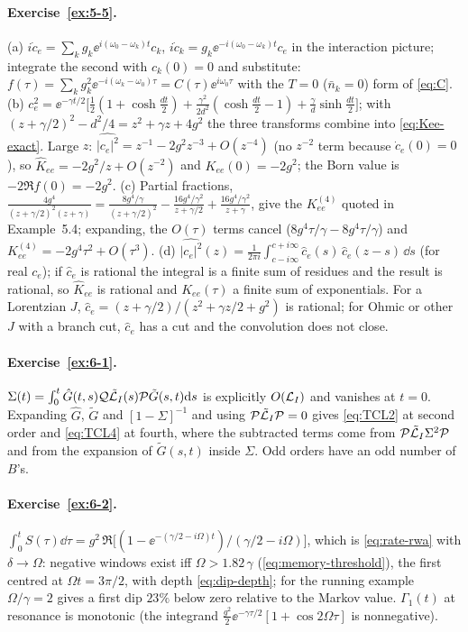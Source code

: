 \paragraph{Exercise~\ref{ex:5-5}.}
(a) $i\dot c_e=\sum_kg_k\ee^{i(\omega_0-\omega_k)t}c_k$, $i\dot c_k=g_k\ee^{-i(\omega_0-\omega_k)t}c_e$ in the interaction picture; integrate the second with $c_k(0)=0$ and substitute: $f(\tau)=\sum_kg_k^2\ee^{-i(\omega_k-\omega_0)\tau}=C(\tau)\ee^{i\omega_0\tau}$ with the $T=0$ ($\bar n_k=0$) form of \cref{eq:C}.
(b) $c_e^2=\ee^{-\gamma t/2}\big[\tfrac12(1+\cosh\tfrac{dt}2)+\tfrac{\gamma^2}{2d^2}(\cosh\tfrac{dt}2-1)+\tfrac\gamma d\sinh\tfrac{dt}2\big]$; with $(z+\gamma/2)^2-d^2/4=z^2+\gamma z+4g^2$ the three transforms combine into \cref{eq:Kee-exact}.
Large $z$: $\widehat{|c_e|^2}=z^{-1}-2g^2z^{-3}+O(z^{-4})$ (no $z^{-2}$ term because $\dot c_e(0)=0$), so $\hat K_{ee}=-2g^2/z+O(z^{-2})$ and $K_{ee}(0)=-2g^2$; the Born value is $-2\Re f(0)=-2g^2$.
(c) Partial fractions, $\frac{4g^4}{(z+\gamma/2)^2(z+\gamma)}=\frac{8g^4/\gamma}{(z+\gamma/2)^2}-\frac{16g^4/\gamma^2}{z+\gamma/2}+\frac{16g^4/\gamma^2}{z+\gamma}$, give the $K^{(4)}_{ee}$ quoted in Example~5.4; expanding, the $O(\tau)$ terms cancel ($8g^4\tau/\gamma-8g^4\tau/\gamma$) and $K^{(4)}_{ee}=-2g^4\tau^2+O(\tau^3)$.
(d) $\widehat{|c_e|^2}(z)=\frac1{2\pi i}\int_{c-i\infty}^{c+i\infty}\hat c_e(s)\,\hat c_e(z-s)\,\dd s$ (for real $c_e$); if $\hat c_e$ is rational the integral is a finite sum of residues and the result is rational, so $\hat K_{ee}$ is rational and $K_{ee}(\tau)$ a finite sum of exponentials.
For a Lorentzian $J$, $\hat c_e=(z+\gamma/2)/(z^2+\gamma z/2+g^2)$ is rational; for Ohmic or other $J$ with a branch cut, $\hat c_e$ has a cut and the convolution does not close.

\paragraph{Exercise~\ref{ex:6-1}.}
$\Sigma(t)=\int_0^t\hat G(t,s)\mathcal{Q}\tilde{\mathcal{L}}_I(s)\mathcal{P}\tilde G(s,t)\mathrm{d} s$ is explicitly $O(\mathcal{L}_I)$ and vanishes at $t=0$.
Expanding $\hat G$, $\tilde G$ and $[1-\Sigma]^{-1}$ and using $\mathcal{P}\tilde{\mathcal{L}}_I\mathcal{P}=0$ gives \cref{eq:TCL2} at second order and \cref{eq:TCL4} at fourth, where the subtracted terms come from $\mathcal{P}\tilde{\mathcal{L}}_I\Sigma^2\mathcal{P}$ and from the expansion of $\tilde G(s,t)$ inside $\Sigma$.
Odd orders have an odd number of $B$'s.

\paragraph{Exercise~\ref{ex:6-2}.}
$\int_0^tS(\tau)\dd\tau=g^2\,\Re\big[(1-\ee^{-(\gamma/2-i\Omega)t})/(\gamma/2-i\Omega)\big]$, which is \cref{eq:rate-rwa} with $\delta\to\Omega$: negative windows exist iff $\Omega>1.82\,\gamma$ (\cref{eq:memory-threshold}), the first centred at $\Omega t=3\pi/2$, with depth \eqref{eq:dip-depth}; for the running example $\Omega/\gamma=2$ gives a first dip $23\%$ below zero relative to the Markov value.
$\Gamma_1(t)$ at resonance is monotonic (the integrand $\tfrac{g^2}{2}\ee^{-\gamma\tau/2}[1+\cos2\Omega\tau]$ is nonnegative).

